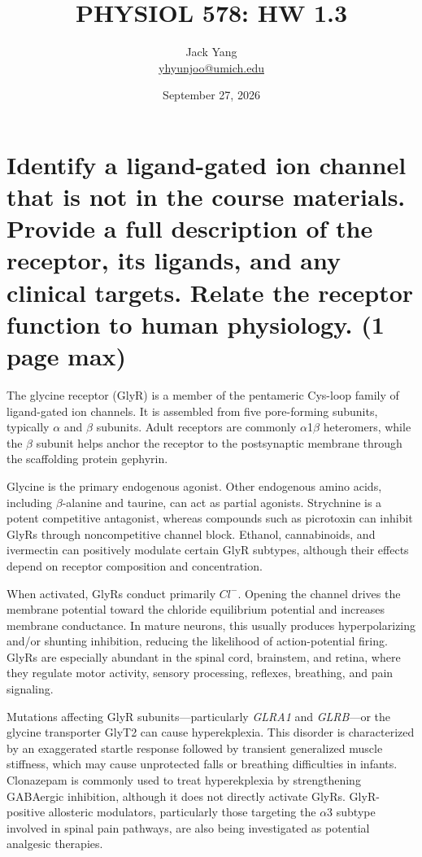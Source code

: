 \documentclass{article}
\title{PHYSIOL 578: HW 1.3\footnotetext{U-M GPT was used to refine language of answers derived independently.}}
\author{Jack Yang \\ \href{mailto:yhyunjoo@umich.edu}{yhyunjoo@umich.edu}}
\date{September 27, 2026}
\begin{document}
\maketitle
\section{
    Identify a ligand-gated ion channel that is not in the course materials.
    Provide a full description of the receptor, its ligands, and any clinical targets.
    Relate the receptor function to human physiology. (1 page max)
}
The glycine receptor (GlyR) is a member of the pentameric Cys-loop family of ligand-gated ion channels.
It is assembled from five pore-forming subunits, typically $\alpha$ and $\beta$ subunits.
Adult receptors are commonly $\alpha$1$\beta$ heteromers, while the $\beta$ subunit helps anchor the receptor to the postsynaptic membrane through the scaffolding protein gephyrin.

Glycine is the primary endogenous agonist.
Other endogenous amino acids, including $\beta$-alanine and taurine, can act as partial agonists.
Strychnine is a potent competitive antagonist, whereas compounds such as picrotoxin can inhibit GlyRs through noncompetitive channel block.
Ethanol, cannabinoids, and ivermectin can positively modulate certain GlyR subtypes, although their effects depend on receptor composition and concentration.

When activated, GlyRs conduct primarily $Cl^-$.
Opening the channel drives the membrane potential toward the chloride equilibrium potential and increases membrane conductance.
In mature neurons, this usually produces hyperpolarizing and/or shunting inhibition, reducing the likelihood of action-potential firing.
GlyRs are especially abundant in the spinal cord, brainstem, and retina, where they regulate motor activity, sensory processing, reflexes, breathing, and pain signaling.

Mutations affecting GlyR subunits—particularly \textit{GLRA1} and \textit{GLRB}—or the glycine transporter GlyT2 can cause hyperekplexia.
This disorder is characterized by an exaggerated startle response followed by transient generalized muscle stiffness, which may cause unprotected falls or breathing difficulties in infants.
Clonazepam is commonly used to treat hyperekplexia by strengthening GABAergic inhibition, although it does not directly activate GlyRs.
GlyR-positive allosteric modulators, particularly those targeting the $\alpha$3 subtype involved in spinal pain pathways, are also being investigated as potential analgesic therapies.
\end{document}
